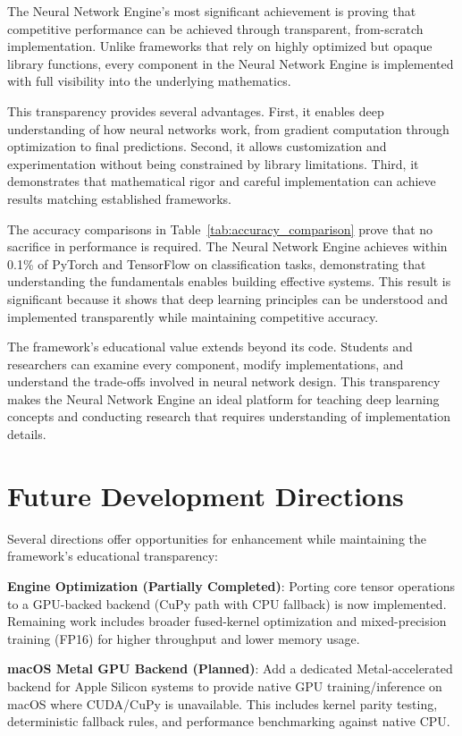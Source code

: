 \documentclass[11pt,a4paper]{report}
\begin{document}
The Neural Network Engine's most significant achievement is proving that competitive performance can be achieved through transparent, from-scratch implementation. Unlike frameworks that rely on highly optimized but opaque library functions, every component in the Neural Network Engine is implemented with full visibility into the underlying mathematics.

This transparency provides several advantages. First, it enables deep understanding of how neural networks work, from gradient computation through optimization to final predictions. Second, it allows customization and experimentation without being constrained by library limitations. Third, it demonstrates that mathematical rigor and careful implementation can achieve results matching established frameworks.

The accuracy comparisons in Table~\ref{tab:accuracy_comparison} prove that no sacrifice in performance is required. The Neural Network Engine achieves within 0.1\% of PyTorch and TensorFlow on classification tasks, demonstrating that understanding the fundamentals enables building effective systems. This result is significant because it shows that deep learning principles can be understood and implemented transparently while maintaining competitive accuracy.

The framework's educational value extends beyond its code. Students and researchers can examine every component, modify implementations, and understand the trade-offs involved in neural network design. This transparency makes the Neural Network Engine an ideal platform for teaching deep learning concepts and conducting research that requires understanding of implementation details.

\section{Future Development Directions}

Several directions offer opportunities for enhancement while maintaining the framework's educational transparency:

\textbf{Engine Optimization (Partially Completed)}: Porting core tensor operations to a GPU-backed backend (CuPy path with CPU fallback) is now implemented. Remaining work includes broader fused-kernel optimization and mixed-precision training (FP16) for higher throughput and lower memory usage.

\textbf{macOS Metal GPU Backend (Planned)}: Add a dedicated Metal-accelerated backend for Apple Silicon systems to provide native GPU training/inference on macOS where CUDA/CuPy is unavailable. This includes kernel parity testing, deterministic fallback rules, and performance benchmarking against native CPU.
\end{document}
